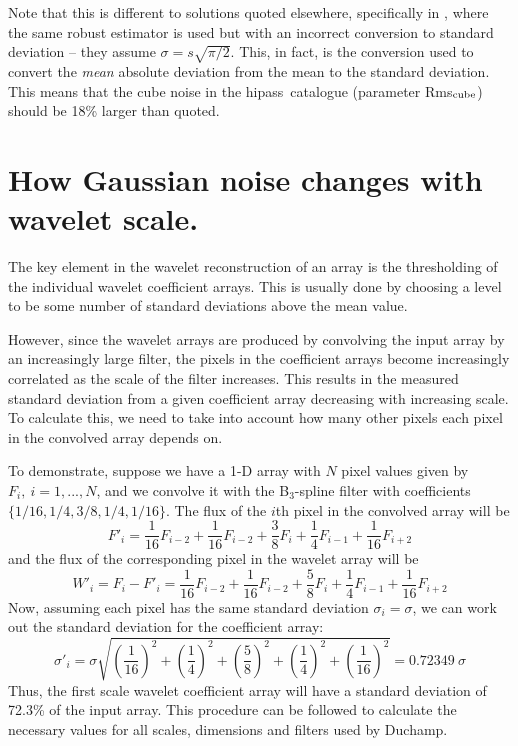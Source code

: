 \documentclass[12pt,a4paper]{article}
\newcommand{\hipass}{{\sc hipass}}
\begin{document}
Note that this is different to solutions quoted elsewhere,
specifically in \citet{meyer04:trunc}, where the same robust estimator
is used but with an incorrect conversion to standard deviation -- they
assume $\sigma = s\sqrt{\pi/2}$. This, in fact, is the conversion used
to convert the {\it mean} absolute deviation from the mean to the
standard deviation. This means that the cube noise in the \hipass\
catalogue (parameter Rms$_{\rm cube}$) should be 18\% larger than
quoted.


\section{How Gaussian noise changes with wavelet scale.}
\label{app-scaling}

The key element in the wavelet reconstruction of an array is the
thresholding of the individual wavelet coefficient arrays. This is
usually done by choosing a level to be some number of standard
deviations above the mean value.

However, since the wavelet arrays are produced by convolving the input
array by an increasingly large filter, the pixels in the coefficient
arrays become increasingly correlated as the scale of the filter
increases. This results in the measured standard deviation from a
given coefficient array decreasing with increasing scale. To calculate
this, we need to take into account how many other pixels each pixel in
the convolved array depends on.

To demonstrate, suppose we have a 1-D array with $N$ pixel values
given by $F_i,\ i=1,...,N$, and we convolve it with the B$_3$-spline
filter with coefficients $\{1/16,1/4,3/8,1/4,1/16\}$. The flux of the
$i$th pixel in the convolved array will be
\[
F'_i = \frac{1}{16}F_{i-2} + \frac{1}{16}F_{i-2} + \frac{3}{8}F_{i}
+ \frac{1}{4}F_{i-1} + \frac{1}{16}F_{i+2}
\]
and the flux of the corresponding pixel in the wavelet array will be 
\[
W'_i = F_i - F'_i = \frac{1}{16}F_{i-2} + \frac{1}{16}F_{i-2} + \frac{5}{8}F_{i}
+ \frac{1}{4}F_{i-1} + \frac{1}{16}F_{i+2}
\]
Now, assuming each pixel has the same standard deviation
$\sigma_i=\sigma$, we can work out the standard deviation for the
coefficient array:
\[
\sigma'_i = \sigma \sqrt{\left(\frac{1}{16}\right)^2 + \left(\frac{1}{4}\right)^2
  + \left(\frac{5}{8}\right)^2 + \left(\frac{1}{4}\right)^2 + \left(\frac{1}{16}\right)^2}
          = 0.72349\ \sigma
\]
Thus, the first scale wavelet coefficient array will have a standard
deviation of 72.3\% of the input array. This procedure can be followed
to calculate the necessary values for all scales, dimensions and
filters used by Duchamp.
\end{document}
